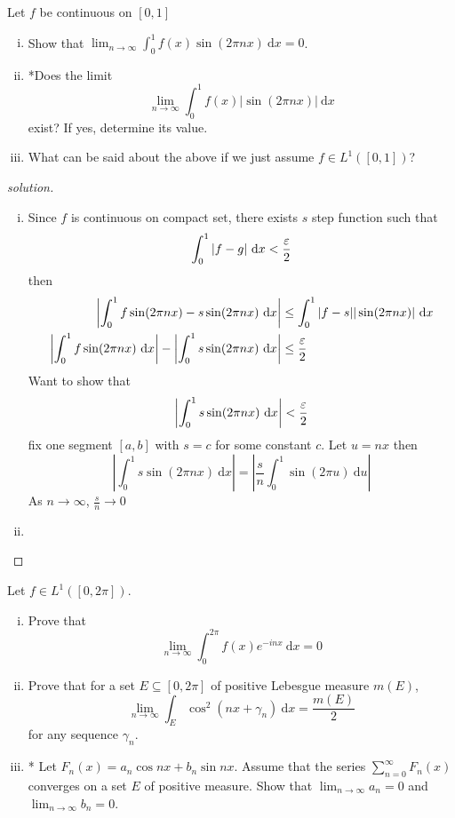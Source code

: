 \begin{problem}
  Let $f$ be continuous on $[0, 1]$
  \begin{enumerate}[(i)]
    \item Show that $\lim_{n\to\infty} \int_0^1f(x)\sin(2\pi nx) \ \mathrm{d}x = 0$.
    \item *Does the limit
    \[\lim_{n\to\infty} \int_0^1 f(x)|\sin(2 \pi nx)|\ \mathrm{d}x\]
    exist? If yes, determine its value.
    \item What can be said about the above if we just assume $f \in L^1([0, 1])$?
  \end{enumerate}
\end{problem}

\begin{proof}[solution]
  \begin{enumerate}[(i)]
    \item Since $f$ is continuous on compact set, there exists $s$ step function such that 
    \[\int_0^1 |f - g| \ \mathrm{d}x < \frac\eps2\]
    then
    \begin{align*}
      \left|\int_0^1 f\sin(2\pi nx) - s \sin(2\pi nx) \ \mathrm{d}x\right| &\le \int_0^1 |f - s||\sin(2\pi nx)| \ \mathrm{d}x\\
      \left|\int_0^1 f\sin(2\pi nx) \ \mathrm{d}x\right| - \left|\int_0^1 s\sin(2\pi nx) \ \mathrm{d}x\right| &\le \frac\eps2
    \end{align*}
    Want to show that
    \[\left|\int_0^1 s \sin(2\pi nx) \ \mathrm{d}x\right| < \frac\eps2\]
    fix one segment $[a, b]$ with $s = c$ for some constant $c$. Let $u = nx$ then
    \[\left|\int_0^1 s \sin(2\pi nx) \ \mathrm{d}x\right| = \left|\frac sn\int_0^1  \sin(2\pi u) \ \mathrm{d}u\right|\]
    As $n \to \infty$, $\frac sn \to 0$
    \item 
  \end{enumerate} 
\end{proof}

\begin{problem}
  Let $f \in L^1([0, 2\pi])$.
  \begin{enumerate}[(i)]
    \item Prove that
    \[\lim_{n\to\infty} \int_0^{2\pi} f(x) e^{-inx} \ \mathrm{d}x = 0\]
    \item Prove that for a set $E \subseteq [0, 2\pi]$ of positive Lebesgue measure $m(E)$,
    \[\lim_{n\to\infty}\int_E \cos^2(nx + \gamma_n)\ \mathrm{d}x = \frac{m(E)}{2}\]
    for any sequence $\gamma_n$.
    \item * Let $F_n(x) = a_n \cos nx + b_n \sin nx$. Assume that the series
    $\sum_{n=0}^\infty F_n(x)$ converges on a set $E$ of positive measure. Show
    that $\lim_{n\to\infty} a_n = 0$ and $\lim_{n\to\infty} b_n = 0$.
  \end{enumerate}
\end{problem}

